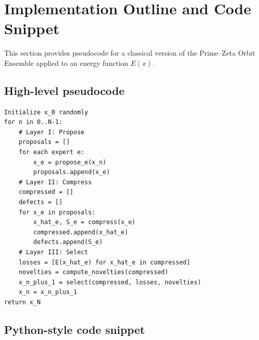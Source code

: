 \documentclass[11pt]{article}
\theoremstyle{definition}
\theoremstyle{plain}
\theoremstyle{remark}
\begin{document}
\section{Implementation Outline and Code Snippet}

This section provides pseudocode for a classical version of the Prime--Zeta Orbit Ensemble applied to an energy function $E(x)$.

\subsection{High-level pseudocode}

\begin{verbatim}
Initialize x_0 randomly
for n in 0..N-1:
    # Layer I: Propose
    proposals = []
    for each expert e:
        x_e = propose_e(x_n)
        proposals.append(x_e)
    # Layer II: Compress
    compressed = []
    defects = []
    for x_e in proposals:
        x_hat_e, S_e = compress(x_e)
        compressed.append(x_hat_e)
        defects.append(S_e)
    # Layer III: Select
    losses = [E(x_hat_e) for x_hat_e in compressed]
    novelties = compute_novelties(compressed)
    x_n_plus_1 = select(compressed, losses, novelties)
    x_n = x_n_plus_1
return x_N
\end{verbatim}

\subsection{Python-style code snippet}
\end{document}
